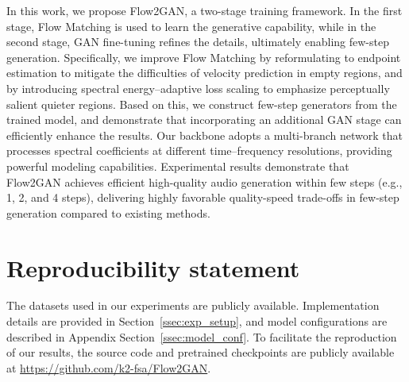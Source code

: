 \documentclass{article} %
\begin{document}


In this work, we propose Flow2GAN, a two-stage training framework. In the first stage, Flow Matching is used to learn the generative capability, while in the second stage, GAN fine-tuning refines the details, ultimately enabling few-step generation. 
Specifically, we improve Flow Matching by reformulating to endpoint estimation to mitigate the difficulties of velocity prediction in empty regions, and by introducing spectral energy–adaptive loss scaling to emphasize perceptually salient quieter regions. 
Based on this, we construct few-step generators from the trained model, and demonstrate that incorporating an additional GAN stage can efficiently enhance the results. 
Our backbone adopts a multi-branch network that processes spectral coefficients at different time–frequency resolutions, providing powerful modeling capabilities.  
Experimental results demonstrate that Flow2GAN achieves efficient high-quality audio generation within few steps (e.g., 1, 2, and 4 steps), delivering highly favorable quality-speed trade-offs in few-step generation compared to existing methods.







\vspace{-0.8em}
\section*{Reproducibility statement}
\vspace{-0.8em}

The datasets used in our experiments are publicly available. Implementation details are provided in Section~\ref{ssec:exp_setup}, and model configurations are described in Appendix Section~\ref{ssec:model_conf}. 
To facilitate the reproduction of our results, the source code and pretrained checkpoints are publicly available at \url{https://github.com/k2-fsa/Flow2GAN}.



\end{document}

